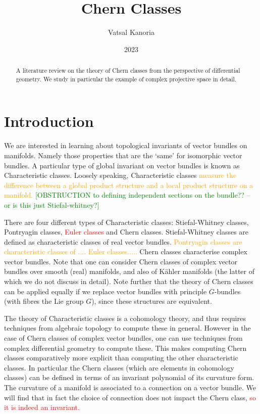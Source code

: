\documentclass[a4paper]{article}
\theoremstyle{definition} \newtheorem*{definition}{Definition}
\theoremstyle{definition} \newtheorem*{definitions}{Definitions}
\theoremstyle{plain} \newtheorem{theorem}{Theorem}[section]
\theoremstyle{plain} \newtheorem{proposition}[theorem]{Proposition}
\theoremstyle{plain} \newtheorem{corollary}[theorem]{Corollary}
\theoremstyle{plain} \newtheorem{lemma}[theorem]{Lemma}
\theoremstyle{plain} \newtheorem{example}[theorem]{Example}
\newcommand{\checkCorrect}[1]{\textcolor{red}{#1}}
\newcommand{\understandBetter}[1]{\textcolor{orange}{#1}}
\newcommand{\finish}[1]{\textcolor{green}{#1}}
\begin{document}
\title{Chern Classes}
\author{Vatsal Kanoria}
\date{2023}
\maketitle

\begin{abstract}
A literature review on the theory of Chern classes from the perspective of differential geometry. We study in particular the example of complex projective space in detail. 
\end{abstract}

\tableofcontents

\section{Introduction}

We are interested in learning about topological invariants of vector bundles on manifolds. Namely those properties that are the `same' for isomorphic vector bundles. A particular type of global invariant on vector bundles is known as Characteristic classes. Loosely speaking, Characteristic classes \understandBetter{measure the difference between a global product structure and a local product structure on a manifold.} \finish{[OBSTRUCTION to defining independent sections on the bundle?? -- or is this just Stiefal-whitney?]}

There are four different types of Characteristic classes: Stiefal-Whitney classes, Pontryagin classes, \checkCorrect{Euler classes} and Chern classes. Stiefal-Whitney classes are defined as characteristic classes of real vector bundles. \understandBetter{Pontryagin classes are characteristic classes of .... Euler classes.....}
Chern classes characterise complex vector bundles. 
Note that one can consider Chern classes of complex vector bundles over smooth (real) manifolds, and also of K{\"a}hler manifolds (the latter of which we do not discuss in detail). Note further that the theory of Chern classes can be applied equally if we replace vector bundles with principle $G$-bundles (with fibres the Lie group $G$), since these structures are equivalent. 

The theory of Characteristic classes is a cohomology theory, and thus requires techniques from algebraic topology to compute these in general. However in the case of Chern classes of complex vector bundles, one can use techniques from complex differential geometry to compute these. This makes computing Chern classes comparatively more explicit than computing the other characteristic classes. In particular the Chern classes (which are elements in cohomology classes) can be defined in terms of an invariant polynomial of its curvature form. The curvature of a manifold is associated to a connection on a vector bundle. We will find that in fact the choice of connection does not impact the Chern class, \checkCorrect{so it is indeed an invariant.}
\end{document}
